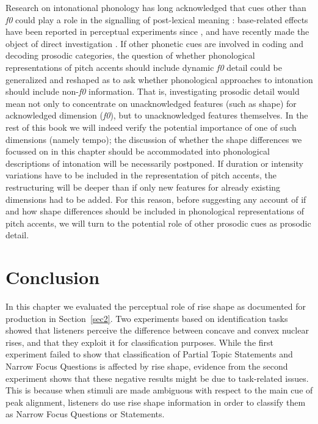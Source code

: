 Research on intonational phonology has long acknowledged that cues other than \textit{f0} could play a role in the signalling of post-lexical meaning \citep{hirschberg1992influence}: base-related effects have been reported in perceptual experiments since \citet{dimperio2000role}, and have recently made the object of direct investigation \citep{niebuhr2010pitchaccent}. If other phonetic cues are involved in coding and decoding prosodic categories, the question of whether phonological representations of pitch accents should include dynamic \textit{f0} detail could be generalized and reshaped as to ask whether phonological approaches to intonation should include non-\textit{f0} information. That is, investigating prosodic detail would mean not only to concentrate on unacknowledged features (such as shape) for acknowledged dimension (\textit{f0}), but to unacknowledged features themselves. In the rest of this book we will indeed verify the potential importance of one of such dimensions (namely tempo); the discussion of whether the shape differences we focussed on in this chapter should be accommodated into phonological descriptions of intonation will be necessarily postponed. If duration or intensity variations have to be included in the representation of pitch accents, the restructuring will be deeper than if only new features for already existing dimensions had to be added. For this reason, before suggesting any account of if and how shape differences should be included in phonological representations of pitch accents, we will turn to the potential role of other prosodic cues as prosodic detail.

\section{Conclusion}\label{sec35}
In this chapter we evaluated the perceptual role of rise shape as documented for production in Section~\ref{sec2}. Two experiments based on identification tasks showed that listeners perceive the difference between concave and convex nuclear rises, and that they exploit it for classification purposes. While the first experiment failed to show that classification of Partial Topic Statements and Narrow Focus Questions is affected by rise shape, evidence from the second experiment shows that these negative results might be due to task-related issues. This is because when stimuli are made ambiguous with respect to the main cue of peak alignment, listeners do use rise shape information in order to classify them as Narrow Focus Questions or Statements. 

